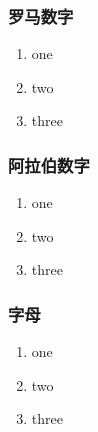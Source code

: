 \subsubsection{罗马数字}
\begin{enumerate}[label=(\roman*)]
	\item one
	\item two
	\item three
\end{enumerate}
\subsubsection{阿拉伯数字}
\begin{enumerate}[label=(\arabic*)]
	\item one
	\item two
	\item three
\end{enumerate}
\subsubsection{字母}
\begin{enumerate}[label=(\alph*)]
	\item one
	\item two
	\item three
\end{enumerate}